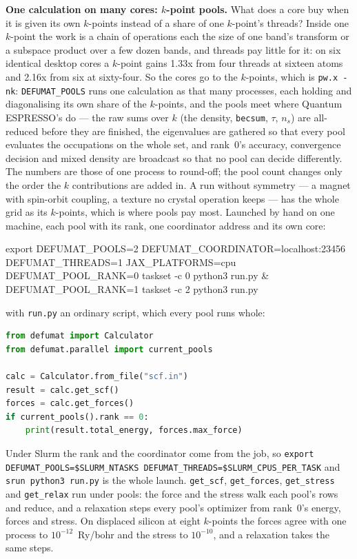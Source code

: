 \documentclass[11pt,a4paper]{article}
\newcommand{\qe}{Quantum ESPRESSO}
\newcommand{\code}[1]{\texttt{\small #1}}
\begin{document}
\textbf{One calculation on many cores: $k$-point pools.} What does a core buy
when it is given its own $k$-points instead of a share of one $k$-point's
threads? Inside one $k$-point the work is a chain of operations each the size of
one band's transform or a subspace product over a few dozen bands, and threads
pay little for it: on six identical desktop cores a $k$-point gains 1.33x from
four threads at sixteen atoms and 2.16x from six at sixty-four. So the cores go
to the $k$-points, which is \code{pw.x -nk}: \code{DEFUMAT\_POOLS} runs one
calculation as that many processes, each holding and diagonalising its own
share of the $k$-points, and the pools meet where \qe's do --- the raw
sums over $k$ (the density, \code{becsum}, $\tau$, $n_s$) are all-reduced before
they are finished, the eigenvalues are gathered so that every pool evaluates the
occupations on the whole set, and rank~0's accuracy, convergence decision and
mixed density are broadcast so that no pool can decide differently. The numbers
are those of one process to round-off; the pool count changes only the order the
$k$ contributions are added in. A run without symmetry --- a magnet with
spin-orbit coupling, a texture no crystal operation keeps --- has the whole grid
as its $k$-points, which is where pools pay most. Launched by hand on one machine,
each pool with its rank, one coordinator address and its own core:

\begin{shcode}
export DEFUMAT_POOLS=2 DEFUMAT_COORDINATOR=localhost:23456 DEFUMAT_THREADS=1 JAX_PLATFORMS=cpu
DEFUMAT_POOL_RANK=0 taskset -c 0 python3 run.py &
DEFUMAT_POOL_RANK=1 taskset -c 2 python3 run.py
\end{shcode}

\noindent with \code{run.py} an ordinary script, which every pool runs whole:

\begin{lstlisting}[language=Python]
from defumat import Calculator
from defumat.parallel import current_pools

calc = Calculator.from_file("scf.in")
result = calc.get_scf()
forces = calc.get_forces()
if current_pools().rank == 0:
    print(result.total_energy, forces.max_force)
\end{lstlisting}

\noindent Under Slurm the rank and the coordinator come from the job, so
\code{export DEFUMAT\_POOLS=\$SLURM\_NTASKS DEFUMAT\_THREADS=\$SLURM\_CPUS\_PER\_TASK}
and \code{srun python3 run.py} is the whole launch. \code{get\_scf},
\code{get\_forces}, \code{get\_stress} and \code{get\_relax} run under pools: the
force and the stress walk each pool's rows and reduce, and a relaxation steps
every pool's optimizer from rank~0's energy, forces and stress. On displaced
silicon at eight $k$-points the forces agree with one process to
$10^{-12}$~Ry/bohr and the stress to $10^{-10}$, and a relaxation takes the same
steps.
\end{document}
